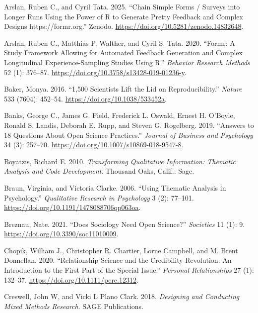 \documentclass[
  english,
  letterpaper,
]{article}
\newlength{\cslhangindent}
\newenvironment{CSLReferences}[2] %
 {\begin{list}{}{%
  \setlength{\itemindent}{0pt}
  \setlength{\leftmargin}{0pt}
  \setlength{\parsep}{0pt}
  \ifodd #1
   \setlength{\leftmargin}{\cslhangindent}
   \setlength{\itemindent}{-1\cslhangindent}
  \fi
  \setlength{\itemsep}{#2\baselineskip}}}
 {\end{list}}
\begin{document}
\label{refs}
\begin{CSLReferences}{1}{0}
Arslan, Ruben C., and Cyril Tata. 2025. {``Chain Simple Forms / Surveys
into Longer Runs Using the Power of {R} to Generate Pretty Feedback and
Complex Designs {https://formr.org}.''} Zenodo.
\url{https://doi.org/10.5281/zenodo.14832648}.

Arslan, Ruben C., Matthias P. Walther, and Cyril S. Tata. 2020.
{``Formr: {A} Study Framework Allowing for Automated Feedback Generation
and Complex Longitudinal Experience-Sampling Studies Using {R}.''}
\emph{Behavior Research Methods} 52 (1): 376--87.
\url{https://doi.org/10.3758/s13428-019-01236-y}.

Baker, Monya. 2016. {``1,500 Scientists Lift the Lid on
Reproducibility.''} \emph{Nature} 533 (7604): 452--54.
\url{https://doi.org/10.1038/533452a}.

Banks, George C., James G. Field, Frederick L. Oswald, Ernest H.
O'Boyle, Ronald S. Landis, Deborah E. Rupp, and Steven G. Rogelberg.
2019. {``Answers to 18 {Questions About Open Science Practices}.''}
\emph{Journal of Business and Psychology} 34 (3): 257--70.
\url{https://doi.org/10.1007/s10869-018-9547-8}.

Boyatzis, Richard E. 2010. \emph{Transforming Qualitative Information:
Thematic Analysis and Code Development}. Thousand Oaks, Calif.: Sage.

Braun, Virginia, and Victoria Clarke. 2006. {``Using Thematic Analysis
in Psychology.''} \emph{Qualitative Research in Psychology} 3 (2):
77--101. \url{https://doi.org/10.1191/1478088706qp063oa}.

Breznau, Nate. 2021. {``Does {Sociology Need Open Science}?''}
\emph{Societies} 11 (1): 9. \url{https://doi.org/10.3390/soc11010009}.

Chopik, William J., Christopher R. Chartier, Lorne Campbell, and M.
Brent Donnellan. 2020. {``Relationship Science and the Credibility
Revolution: {An} Introduction to the First Part of the Special Issue.''}
\emph{Personal Relationships} 27 (1): 132--37.
\url{https://doi.org/10.1111/pere.12312}.

Creswell, John W, and Vicki L Plano Clark. 2018. \emph{Designing and
{Conducting Mixed Methods Research}}. SAGE Publications.


\end{CSLReferences}
\end{document}
